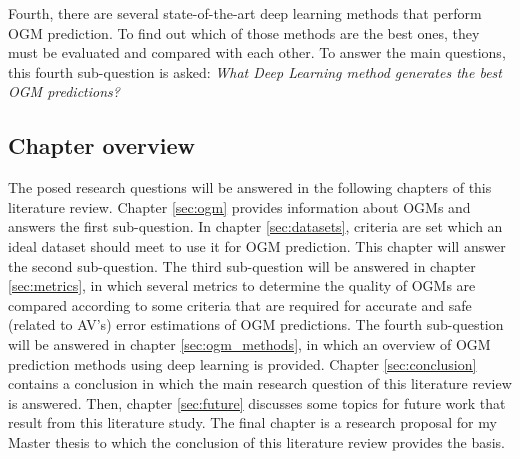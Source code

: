 Fourth, there are several state-of-the-art deep learning methods that perform \gls{OGM} prediction. To find out which of those methods are the best ones, they must be evaluated and compared with each other. To answer the main questions, this fourth sub-question is asked: \textit{What Deep Learning method generates the best OGM predictions?}

\subsection{Chapter overview}
The posed research questions will be answered in the following chapters of this literature review. Chapter \ref{sec:ogm} provides information about \glspl{OGM} and answers the first sub-question. In chapter \ref{sec:datasets}, criteria are set which an ideal dataset should meet to use it for \gls{OGM} prediction. This chapter will answer the second sub-question. The third sub-question will be answered in chapter \ref{sec:metrics}, in which several metrics to determine the quality of \glspl{OGM} are compared according to some criteria that are required for accurate and safe (related to \gls{AV}'s) error estimations of \gls{OGM} predictions. The fourth sub-question will be answered in chapter \ref{sec:ogm_methods}, in which an overview of \gls{OGM} prediction methods using deep learning is provided. Chapter \ref{sec:conclusion} contains a conclusion in which the main research question of this literature review is answered. Then, chapter \ref{sec:future} discusses some topics for future work that result from this literature study. The final chapter is a research proposal for my Master thesis to which the conclusion of this literature review provides the basis.









